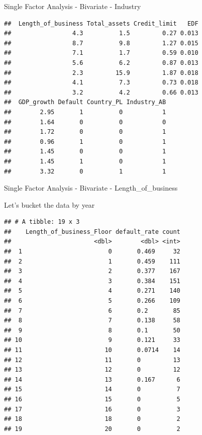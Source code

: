 \documentclass[9pt,ignorenonframetext,]{beamer}
\begin{document}
\begin{frame}[fragile]{Single Factor Analysis - Bivariate - Industry}

\begin{verbatim}
##  Length_of_business Total_assets Credit_limit   EDF
##                 4.3          1.5         0.27 0.013
##                 8.7          9.8         1.27 0.015
##                 7.1          1.7         0.59 0.010
##                 5.6          6.2         0.87 0.013
##                 2.3         15.9         1.87 0.018
##                 4.1          7.3         0.73 0.018
##                 3.2          4.2         0.66 0.013
##  GDP_growth Default Country_PL Industry_AB
##        2.95       1          0           1
##        1.64       0          0           0
##        1.72       0          0           1
##        0.96       1          0           1
##        1.45       0          0           1
##        1.45       1          0           1
##        3.32       0          1           1
\end{verbatim}

\end{frame}

\begin{frame}[fragile]{Single Factor Analysis - Bivariate -
Length\_of\_business}

Let's bucket the data by year

\begin{verbatim}
## # A tibble: 19 x 3
##    Length_of_business_Floor default_rate count
##                       <dbl>        <dbl> <int>
##  1                        0       0.469     32
##  2                        1       0.459    111
##  3                        2       0.377    167
##  4                        3       0.384    151
##  5                        4       0.271    140
##  6                        5       0.266    109
##  7                        6       0.2       85
##  8                        7       0.138     58
##  9                        8       0.1       50
## 10                        9       0.121     33
## 11                       10       0.0714    14
## 12                       11       0         13
## 13                       12       0         12
## 14                       13       0.167      6
## 15                       14       0          7
## 16                       15       0          5
## 17                       16       0          3
## 18                       18       0          2
## 19                       20       0          2
\end{verbatim}

\end{frame}
\end{document}
